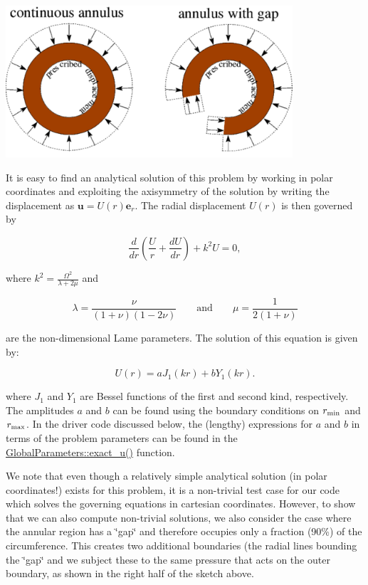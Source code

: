  
\begin{DoxyImage}
\includegraphics[width=0.8\textwidth]{sketch}
\end{DoxyImage}


It is easy to find an analytical solution of this problem by working in polar coordinates and exploiting the axisymmetry of the solution by writing the displacement as $ \displaystyle {\mathbf{u}} = U(r) {\mathbf{e}}_r $. The radial displacement $ U(r) $ is then governed by \begin{center} \[ \frac{d}{d r}\left(\frac{U}{r}+\frac{dU}{dr}\right) + k^2 U=0, \] \end{center}  where $ \displaystyle k^2= \frac{\Omega^2}{\lambda+2\mu}$ and \begin{center} \[ \lambda = \frac{\nu}{(1+\nu)(1-2\nu)} \qquad \textrm{and} \qquad \mu = \frac{1}{2(1+\nu)} \] \end{center}  are the non-\/dimensional Lame parameters. The solution of this equation is given by\+: \begin{center} \[ U(r) = aJ_1(kr)+bY_1(kr). \] \end{center}  where $ J_1 $ and $ Y_1 $ are Bessel functions of the first and second kind, respectively. The amplitudes $ a $ and $ b $ can be found using the boundary conditions on $ r_{\rm min} $ and $ r_{\rm max} $. In the driver code discussed below, the (lengthy) expressions for $ a $ and $ b $ in terms of the problem parameters can be found in the {\ttfamily  \hyperlink{namespaceGlobal__Parameters_a97162dba4bd29a15067b9c9bbe53c754}{Global\+Parameters\+::exact\+\_\+u()} } function.

We note that even though a relatively simple analytical solution (in polar coordinates!) exists for this problem, it is a non-\/trivial test case for our code which solves the governing equations in cartesian coordinates. However, to show that we can also compute non-\/trivial solutions, we also consider the case where the annular region has a \char`\"{}gap\char`\"{} and therefore occupies only a fraction (90\%) of the circumference. This creates two additional boundaries (the radial lines bounding the \char`\"{}gap\char`\"{} and we subject these to the same pressure that acts on the outer boundary, as shown in the right half of the sketch above.



